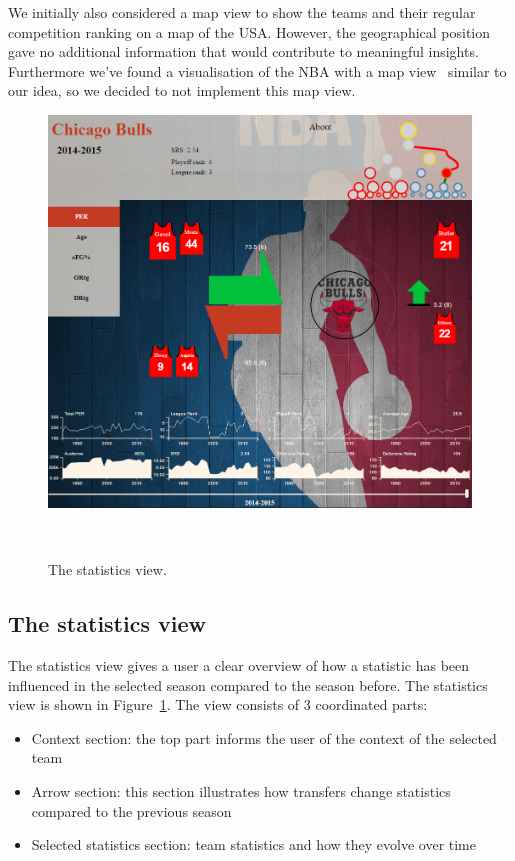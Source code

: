 \documentclass[]{sigchi}
\begin{document}

We initially also considered a map view to show the teams and their regular
competition ranking on a map of the USA. However, the geographical position gave
no additional information that would contribute to meaningful insights. Furthermore we've found a visualisation
of the NBA with a map view~\cite{mapviewvisualization} similar to our idea, so
we decided to not implement this map view. 

\begin{figure}
\centering
  \includegraphics[width=1.0\columnwidth]{figures/statisticsview}
  \caption{The statistics view.}~\label{fig:statisticsview}
\end{figure}

\subsection{The statistics view}
The statistics view gives a user a clear overview of how a statistic has been
influenced in the selected season compared to the season before. The statistics
view is shown in Figure~\ref{fig:statisticsview}. The view consists of 3
coordinated parts:
\begin{itemize}
    \item Context section: the top part informs the user of the context of the
        selected team
    \item Arrow section: this section illustrates how transfers change statistics
        compared to the previous season
    \item Selected statistics section: team statistics and how they evolve over
        time
\end{itemize}
\end{document}
